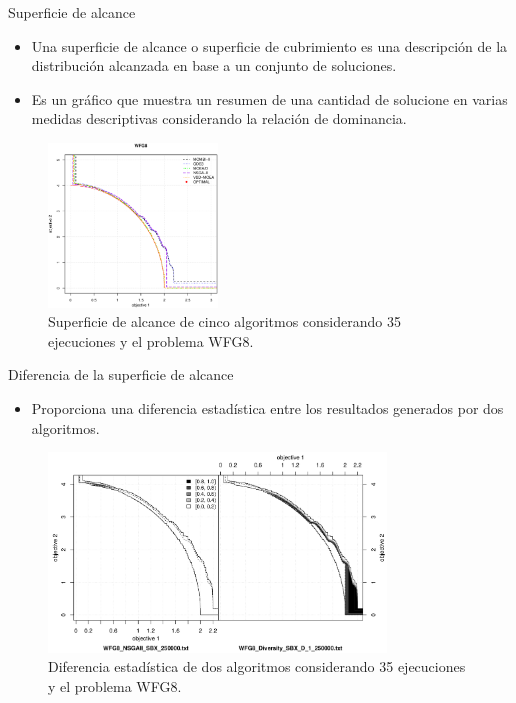\documentclass{beamer}
\begin{document}
\begin{frame}{Superficie de alcance}
\begin{itemize}
\item Una superficie de alcance o superficie de cubrimiento es una descripción de la distribución alcanzada en base a un conjunto de soluciones.
\item Es un gráfico que muestra un resumen de una cantidad de solucione en varias medidas descriptivas considerando la relación de dominancia.
\end{itemize}
\begin{figure}[H]
\includegraphics[width=0.4\textwidth]{superficie_alcance_WFG8.eps}
\centering
\caption{\scriptsize Superficie de alcance de cinco algoritmos considerando 35 ejecuciones y el problema WFG8.}
\end{figure}
\end{frame}


\begin{frame}{Diferencia de la superficie de alcance}
\begin{itemize}
\item Proporciona una diferencia estadística entre los resultados generados por dos algoritmos.
\end{itemize}
\begin{figure}[H]
 \includegraphics[width=0.8\textwidth]{diff_plot.png} 
\centering
\caption{\scriptsize Diferencia estadística de dos algoritmos considerando 35 ejecuciones y el problema WFG8.}
\end{figure}

\end{frame}
\end{document}
